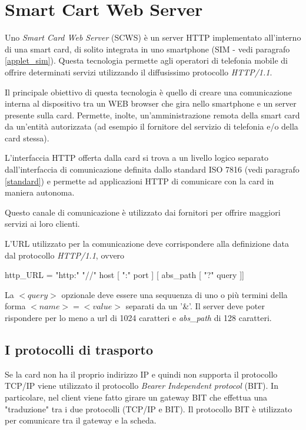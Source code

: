 \section{Smart Cart Web Server}
Uno \textit{Smart Card Web Server} (SCWS) è un server HTTP implementato all'interno di una smart card, di solito integrata in uno smartphone (SIM - vedi paragrafo \ref{applet_sim}). Questa tecnologia permette agli operatori di telefonia mobile di offrire determinati servizi utilizzando il diffusissimo protocollo \textit{HTTP/1.1}.

Il principale obiettivo di questa tecnologia è quello di creare una comunicazione interna al dispositivo tra un WEB browser che gira nello smartphone e un server presente sulla card. Permette, inolte, un'amministrazione remota della smart card da un'entità autorizzata (ad esempio il fornitore del servizio di telefonia e/o della card stessa).

L'interfaccia HTTP offerta dalla card si trova a un livello logico separato dall'interfaccia di comunicazione definita dallo standard ISO 7816 (vedi paragrafo \ref{standard}) e permette ad applicazioni HTTP di comunicare con la card in maniera autonoma.

Questo canale di comunicazione è utilizzato dai fornitori per offrire maggiori servizi ai loro clienti.

L'URL utilizzato per la comunicazione deve corrispondere alla definizione data dal protocollo \textit{HTTP/1.1}, ovvero

\begin{center}
    http\_URL = "http:" "//" host [ ":" port ] [ abs\_path [ "?" query ]]
\end{center}

La $<query>$ opzionale deve essere una sequuenza di uno o più termini della forma $<name>=<value>$ separati da un '\&'. Il server deve poter rispondere per lo meno a url di 1024 caratteri e \textit{abs\_path} di 128 caratteri.

\subsection{I protocolli di trasporto}
Se la card non ha il proprio indirizzo IP e quindi non supporta il protocollo TCP/IP viene utilizzato il protocollo \textit{ Bearer Independent protocol} (BIT). In particolare, nel client viene fatto girare un gateway BIT che effettua una "traduzione" tra i due protocolli (TCP/IP e BIT). Il protocollo BIT è utilizzato per comunicare tra il gateway e la scheda.

